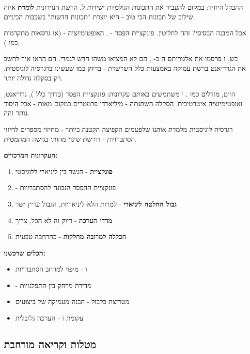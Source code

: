 ההבדל היחיד: במקום להעביר את התכונות הגולמיות ישירות ל, הרשת הנוירונית \textbf{לומדת} איזה שילוב של תכונות הכי טוב - היא יוצרת "תכונות חדשות" בשכבות הביניים.

אבל המבנה הבסיסי? זהה לחלוטין. פונקציית הפסד - . האופטימיזציה -  (או גרסאות מתקדמות כמו ).

כש, ו פרסמו את אלגוריתם ה ב- \cite{rumelhart1986}, הם לא המציאו משהו חדש לגמרי. הם הראו איך לחשב את הגרדיאנט ברשת עמוקה באמצעות כלל השרשרת - בדיוק כמו שעשינו ברגרסיה לוגיסטית, רק בסקלה גדולה יותר.

היום, מודלים כמו , ו משתמשים באותם עקרונות: פונקציית הפסד (בדרך כלל ), גרדיאנט, ואופטימיזציה איטרטיבית. הסקלה השתנתה - מיליארדי פרמטרים במקום מאות - אבל היסוד נותר זהה.


רגרסיה לוגיסטית מלמדת אותנו שלפעמים הקפיצה הקטנה ביותר - מחיזוי מספרים לחיזוי הסתברויות - דורשת שינוי מהותי בגישה המתמטית.

\textbf{העקרונות המרכזיים:}

\begin{enumerate}
\item \textbf{פונקציית } - הגשר בין ליניארי ללוגיסטי
\item \textbf{} - פונקציית ההפסד הנכונה להסתברויות
\item \textbf{גבול החלטה ליניארי} - למרות הלא-ליניאריות, הגבול עדיין ישר
\item \textbf{מדדי הערכה} - דיוק זה לא הכל, צריך 
\item \textbf{הכללה למרובה מחלקות} -  כהרחבה טבעית
\end{enumerate}

\textbf{הכלים שרכשנו:}

\begin{itemize}
\item {} ו - מיפוי למרחב הסתברויות
\item {} - מדידת מרחק בין התפלגויות
\item מטריצת בלבול - הבנה מעמיקה של ביצועים
\item עקומת  ו - הערכה גלובלית
\end{itemize}

\subsection*{מטלות וקריאה מורחבת}

